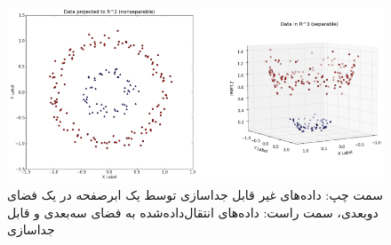 \begin{figure}
\centering
\includegraphics[width=15cm]{Figures/RBFKernel.png}
\caption{ سمت چپ: داده‌های غیر قابل جداسازی توسط یک ابرصفحه در یک فضای دوبعدی، سمت راست: داده‌های انتقال‌داده‌شده به فضای سه‌بعدی و قابل جداسازی\cite{TowardsScienceRBF}}
\label{fig:RBFKernel}
\end{figure}

